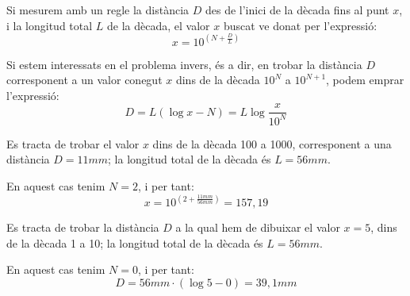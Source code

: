 Si mesurem amb un regle la dist\`{a}ncia $D$ des de l'inici de la d\`{e}cada fins al punt $x$, i
la longitud total $L$ de la d\`{e}cada, el valor $x$ buscat ve donat per l'expressi\'{o}:
\begin{equation}
    x = 10^{\left(N+\frac{D}{L}\right)}
\end{equation}

Si estem interessats en el problema invers, \'{e}s a dir, en  trobar la dist\`{a}ncia $D$
corresponent a un valor conegut $x$ dins de la d\`{e}cada $10^N$ a $10^{N+1}$, podem emprar
l'expressi\'{o}:
\begin{equation}
    D = L(\log x - N) = L \log\frac{x}{10^N}
\end{equation}

\begin{exemple}
Es tracta de trobar el valor $x$ dins de la d\`{e}cada 100 a 1000, corresponent a una
dist\`{a}ncia $D=11\unit{mm}$; la longitud total de la d\`{e}cada \'{e}s $L=56\unit{mm}$.

En aquest cas tenim $N=2$, i per tant:
\[
    x = 10^{\left(2+\frac{11\unit{mm}}{56\unit{mm}}\right)}= 157{,}19
\]
\end{exemple}

\begin{exemple}
Es tracta de trobar la dist\`{a}ncia $D$ a la qual hem de dibuixar el valor $x=5$, dins de la
d\`{e}cada 1 a 10; la longitud total de la d\`{e}cada \'{e}s $L=56\unit{mm}$.

En aquest cas tenim $N=0$, i per tant:
\[
    D = 56\unit{mm} \cdot (\log 5 - 0)  = 39{,}1\unit{mm}
\]
\end{exemple}
